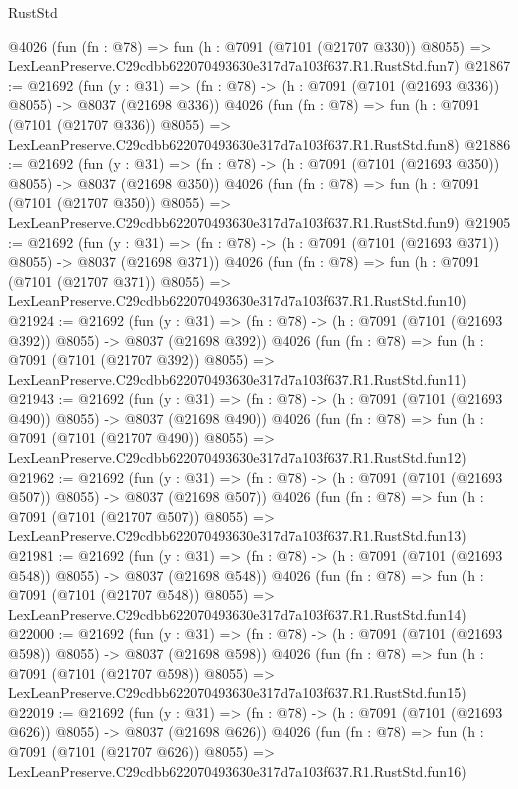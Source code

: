 \begin{lexlean}{RustStd}
\begin{coremodule}
    @4026
    (fun (fn : @78) =>
    fun (h : @7091 (@7101 (@21707 @330)) @8055) =>
    LexLeanPreserve.C29cdbb622070493630e317d7a103f637.R1.RustStd.fun7)
@21867 := @21692
    (fun (y : @31) => (fn : @78) -> (h : @7091 (@7101 (@21693 @336)) @8055) -> @8037 (@21698 @336))
    @4026
    (fun (fn : @78) =>
    fun (h : @7091 (@7101 (@21707 @336)) @8055) =>
    LexLeanPreserve.C29cdbb622070493630e317d7a103f637.R1.RustStd.fun8)
@21886 := @21692
    (fun (y : @31) => (fn : @78) -> (h : @7091 (@7101 (@21693 @350)) @8055) -> @8037 (@21698 @350))
    @4026
    (fun (fn : @78) =>
    fun (h : @7091 (@7101 (@21707 @350)) @8055) =>
    LexLeanPreserve.C29cdbb622070493630e317d7a103f637.R1.RustStd.fun9)
@21905 := @21692
    (fun (y : @31) => (fn : @78) -> (h : @7091 (@7101 (@21693 @371)) @8055) -> @8037 (@21698 @371))
    @4026
    (fun (fn : @78) =>
    fun (h : @7091 (@7101 (@21707 @371)) @8055) =>
    LexLeanPreserve.C29cdbb622070493630e317d7a103f637.R1.RustStd.fun10)
@21924 := @21692
    (fun (y : @31) => (fn : @78) -> (h : @7091 (@7101 (@21693 @392)) @8055) -> @8037 (@21698 @392))
    @4026
    (fun (fn : @78) =>
    fun (h : @7091 (@7101 (@21707 @392)) @8055) =>
    LexLeanPreserve.C29cdbb622070493630e317d7a103f637.R1.RustStd.fun11)
@21943 := @21692
    (fun (y : @31) => (fn : @78) -> (h : @7091 (@7101 (@21693 @490)) @8055) -> @8037 (@21698 @490))
    @4026
    (fun (fn : @78) =>
    fun (h : @7091 (@7101 (@21707 @490)) @8055) =>
    LexLeanPreserve.C29cdbb622070493630e317d7a103f637.R1.RustStd.fun12)
@21962 := @21692
    (fun (y : @31) => (fn : @78) -> (h : @7091 (@7101 (@21693 @507)) @8055) -> @8037 (@21698 @507))
    @4026
    (fun (fn : @78) =>
    fun (h : @7091 (@7101 (@21707 @507)) @8055) =>
    LexLeanPreserve.C29cdbb622070493630e317d7a103f637.R1.RustStd.fun13)
@21981 := @21692
    (fun (y : @31) => (fn : @78) -> (h : @7091 (@7101 (@21693 @548)) @8055) -> @8037 (@21698 @548))
    @4026
    (fun (fn : @78) =>
    fun (h : @7091 (@7101 (@21707 @548)) @8055) =>
    LexLeanPreserve.C29cdbb622070493630e317d7a103f637.R1.RustStd.fun14)
@22000 := @21692
    (fun (y : @31) => (fn : @78) -> (h : @7091 (@7101 (@21693 @598)) @8055) -> @8037 (@21698 @598))
    @4026
    (fun (fn : @78) =>
    fun (h : @7091 (@7101 (@21707 @598)) @8055) =>
    LexLeanPreserve.C29cdbb622070493630e317d7a103f637.R1.RustStd.fun15)
@22019 := @21692
    (fun (y : @31) => (fn : @78) -> (h : @7091 (@7101 (@21693 @626)) @8055) -> @8037 (@21698 @626))
    @4026
    (fun (fn : @78) =>
    fun (h : @7091 (@7101 (@21707 @626)) @8055) =>
    LexLeanPreserve.C29cdbb622070493630e317d7a103f637.R1.RustStd.fun16)

\end{coremodule}
\end{lexlean}
